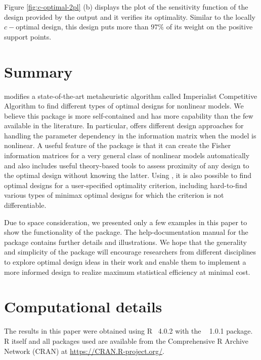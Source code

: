 Figure \ref{fig:c-optimal-2pl} (b) displays the plot of the sensitivity function of the design provided by the output  and it verifies its optimality.
Similar to the locally  $c-$optimal design, this design puts more than  $97\%$  of its weight on the positive support points.
\section{Summary}
\label{sec:summary}

 modifies a state-of-the-art metaheuristic algorithm called Imperialist Competitive Algorithm   to find  different types of optimal designs for nonlinear models. We believe this package is more self-contained and has more capability than the few available in the literature. In particular,  offers different design approaches  for handling the parameter dependency in the information matrix when the model is nonlinear. A useful feature of the   package is that it can  create  the Fisher information matrices for a very general class of  nonlinear models automatically and also includes useful theory-based tools   to assess proximity of any design to the   optimal design without knowing the latter.
Using , it is also possible  to find optimal designs for a user-specified optimality criterion, including hard-to-find various types of minimax   optimal designs for which the criterion is not differentiable.

Due to space consideration, we presented only a few   examples in this paper to   show the functionality of the package.
The help-documentation manual for the package contains further details and illustrations.  We hope that the generality and simplicity of the  package will encourage researchers from different disciplines  to explore  optimal design ideas in their work and enable them to implement a more informed design to realize maximum statistical efficiency at minimal cost.


\section*{Computational details}
The results in this paper were obtained using
R~  4.0.2  with the
~ 1.0.1 package. R itself
and all packages used are available from the Comprehensive
R Archive Network (CRAN) at
\url{https://CRAN.R-project.org/}.


